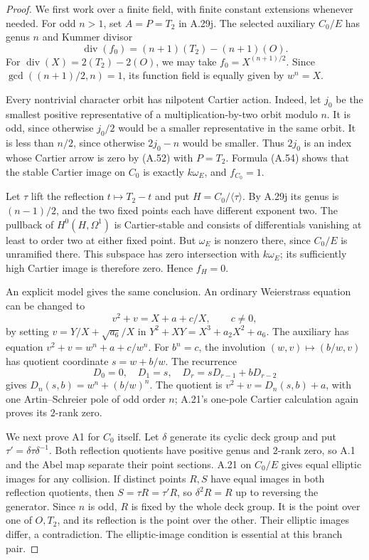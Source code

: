 \begin{proof}
We first work over a finite field, with finite constant
extensions whenever needed. For odd $n>1$, set
$A=P=T_2$ in A.29j. The selected auxiliary $C_0/E$
has genus $n$ and Kummer divisor
\[
 \operatorname{div}(f_0)=(n+1)(T_2)-(n+1)(O).
\]
For $\operatorname{div}(X)=2(T_2)-2(O)$, we may take
$f_0=X^{(n+1)/2}$. Since $\gcd((n+1)/2,n)=1$, its
function field is equally given by $w^n=X$.

Every nontrivial character orbit has nilpotent Cartier
action. Indeed, let $j_0$ be the smallest positive
representative of a multiplication-by-two orbit
modulo $n$. It is odd, since otherwise $j_0/2$ would
be a smaller representative in the same orbit.
It is less than $n/2$, since otherwise $2j_0-n$
would be smaller. Thus $2j_0$ is an index whose
Cartier arrow is zero by \textup{(A.52)} with $P=T_2$.
Formula \textup{(A.54)} shows that the stable Cartier
image on $C_0$ is exactly $k\omega_E$, and $f_{C_0}=1$.

Let $\tau$ lift the reflection $t\mapsto T_2-t$ and
put $H=C_0/\langle\tau\rangle$.
By A.29j its genus is $(n-1)/2$, and the two fixed
points each have different exponent two. The
pullback of $H^0(H,\Omega^1)$ is Cartier-stable and
consists of differentials vanishing at least to
order two at either fixed point. But $\omega_E$
is nonzero there, since $C_0/E$ is unramified there.
This subspace has zero intersection with $k\omega_E$;
its sufficiently high Cartier image is therefore
zero. Hence $f_H=0$.

An explicit model gives the same conclusion.
An ordinary Weierstrass equation can be changed to
\[
 v^2+v=X+a+c/X,\qquad c\ne0,
\]
by setting $v=Y/X+\sqrt{a_6}/X$ in
$Y^2+XY=X^3+a_2X^2+a_6$.
The auxiliary has equation
$v^2+v=w^n+a+c/w^n$.
For $b^n=c$, the involution
$(w,v)\mapsto(b/w,v)$ has quotient coordinate
$s=w+b/w$. The recurrence
\[
 D_0=0,\quad D_1=s,\quad
 D_r=sD_{r-1}+bD_{r-2}
\]
gives $D_n(s,b)=w^n+(b/w)^n$. The quotient is
$v^2+v=D_n(s,b)+a$, with one Artin--Schreier pole
of odd order $n$; A.21's one-pole Cartier calculation
again proves its $2$-rank zero.

We next prove A1 for $C_0$ itself. Let $\delta$ generate
its cyclic deck group and put
$\tau'=\delta\tau\delta^{-1}$. Both reflection
quotients have positive genus and $2$-rank zero,
so A.1 and the Abel map separate their point sections.
A.21 on $C_0/E$ gives equal elliptic images for any
collision. If distinct points $R,S$ have equal
images in both reflection quotients, then
$S=\tau R=\tau'R$, so $\delta^2R=R$ up to reversing
the generator. Since $n$ is odd, $R$ is fixed by
the whole deck group. It is the point over one of
$O,T_2$, and its reflection is the point over the
other. Their elliptic images differ, a contradiction.
The elliptic-image condition is essential at this
branch pair.


\end{proof}
